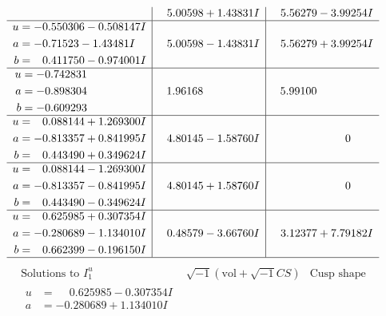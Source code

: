 \documentclass[1p]{elsarticle_modified}
\theoremstyle{definition}
\newcommand{\I}{\sqrt{-1}}
\begin{document}
$$\begin{array}{c|c|c}
 & \phantom{-}5.00598 + 1.43831 I & \phantom{-}5.56279 - 3.99254 I \\ \hline\begin{aligned}
u &= -0.550306 - 0.508147 I \\
a &= -0.71523 - 1.43481 I \\
b &= \phantom{-}0.411750 - 0.974001 I\end{aligned}
 & \phantom{-}5.00598 - 1.43831 I & \phantom{-}5.56279 + 3.99254 I \\ \hline\begin{aligned}
u &= -0.742831\phantom{ +0.000000I} \\
a &= -0.898304\phantom{ +0.000000I} \\
b &= -0.609293\phantom{ +0.000000I}\end{aligned}
 & \phantom{-}1.96168\phantom{ +0.000000I} & \phantom{-}5.99100\phantom{ +0.000000I} \\ \hline\begin{aligned}
u &= \phantom{-}0.088144 + 1.269300 I \\
a &= -0.813357 + 0.841995 I \\
b &= \phantom{-}0.443490 + 0.349624 I\end{aligned}
 & \phantom{-}4.80145 - 1.58760 I & \phantom{-0.000000 } 0 \\ \hline\begin{aligned}
u &= \phantom{-}0.088144 - 1.269300 I \\
a &= -0.813357 - 0.841995 I \\
b &= \phantom{-}0.443490 - 0.349624 I\end{aligned}
 & \phantom{-}4.80145 + 1.58760 I & \phantom{-0.000000 } 0 \\ \hline\begin{aligned}
u &= \phantom{-}0.625985 + 0.307354 I \\
a &= -0.280689 - 1.134010 I \\
b &= \phantom{-}0.662399 - 0.196150 I\end{aligned}
 & \phantom{-}0.48579 - 3.66760 I & \phantom{-}3.12377 + 7.79182 I\\
 \hline 
 \end{array}$$\newpage$$\begin{array}{c|c|c}  
\text{Solutions to }I^u_{1}& \I (\text{vol} + \sqrt{-1}CS) & \text{Cusp shape}\\
 \hline 
\begin{aligned}
u &= \phantom{-}0.625985 - 0.307354 I \\
a &= -0.280689 + 1.134010 I \\

\end{aligned}
\end{array}$$
\end{document}
